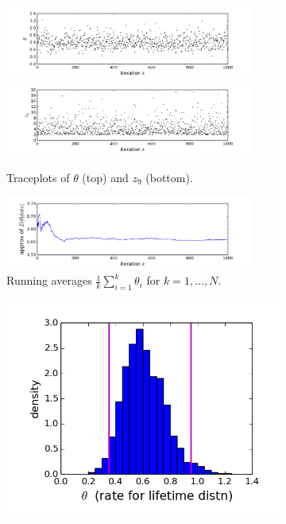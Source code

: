 \documentclass[12pt]{article}
\begin{document}
\begin{figure}
    \centering
    \begin{subfigure}[t]{1\textwidth}
        \centering
        \includegraphics[trim=0 0.4cm 0 0, clip, width=0.9\textwidth]{censored-theta_trace.png}
        \includegraphics[trim=0 0.4cm 0 0, clip, width=0.9\textwidth]{censored-z_trace.png}
        \caption{Traceplots of $\theta$ (top) and $z_9$ (bottom).}
    \end{subfigure}
    \begin{subfigure}[t]{1\textwidth}
        \centering
        \includegraphics[trim=0 0.2cm 0 0, clip, width=0.9\textwidth]{censored-theta_means.png}
        \caption{Running averages $\frac{1}{k}\sum_{i = 1}^k \theta_i$ for $k=1,\ldots,N$.}
    \end{subfigure}
    \begin{subfigure}[t]{0.49\textwidth}
        \centering
        \includegraphics[trim=0 0.6cm 0 0, clip, width=1\textwidth]{censored-theta_density.png}

\end{subfigure}
\end{figure}
\end{document}
